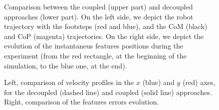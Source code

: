 \begin{figure}[ht]
 \caption{\label{Fig:Comparisons-approaches} Comparison between the coupled (upper part) and decoupled approaches (lower part). On the left side, we depict the robot trajectory with the footsteps (red and blue), and the CoM (black) and CoP (magenta) trajectories. On the right side, we depict the evolution of the instantaneus features positions during the experiment (from the red rectangle, at the beginning of the simulation, to the blue one, at the end).}
 \end{figure}

\begin{figure}[ht]
 \centering
 \caption{\label{Fig:Comparisons-velocitieserrors} Left, comparison of velocity profiles in the $x$ (blue) and $y$ (red) axes, for the decoupled (dashed line) and coupled (solid line) approaches. Right, comparison of the features errors evolution.}
 \end{figure}

